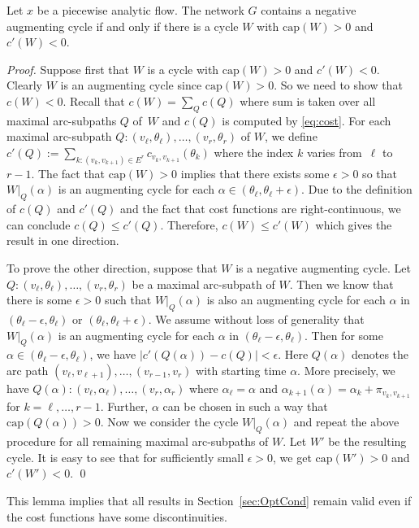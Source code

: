 \documentclass{svjour3}                     \smartqed
\newcommand{\ca}{\ensuremath{\text{cap}}}
\begin{document}
\begin{lemma}
\label{lem:neg-aug-cycle}
Let $x$ be a piecewise analytic flow. The network $G$ contains a negative augmenting cycle if and only if there is a cycle $W$ with $\ca(W)>0$ and \mbox{$c'(W)<0$}.
\end{lemma}
\begin{proof}
Suppose first that $W$ is a cycle with $\ca(W)>0$ and $c'(W)<0$. Clearly $W$ is an augmenting cycle since $\ca(W)>0$. So we need to show that $c(W)<0$. Recall that $c(W)=\sum_{Q} c(Q)$ where sum is taken over all maximal arc-subpaths $Q$ of~$W$ and $c(Q)$ is computed by \eqref{eq:cost}. For each maximal arc-subpath $Q:(v_\ell,\theta_\ell),\ldots,(v_r,\theta_r)$ of $W$, we define $c'(Q):=\sum_{k:(v_k,v_{k+1})\in E^r} c_{v_k,v_{k+1}}(\theta_{k})$ where the index $k$ varies from~$\ell$ to $r-1$. The fact that $\ca(W)>0$ implies that there exists some $\epsilon>0$ so that $W|_Q(\alpha)$ is an augmenting cycle for each $\alpha\in (\theta_\ell,\theta_\ell+\epsilon)$. Due to the definition of $c(Q)$ and $c'(Q)$ and the fact that cost functions are right-continuous, we can conclude $c(Q)\leq c'(Q)$. Therefore, $c(W)\leq c'(W)$ which gives the result in one direction.

To prove the other direction, suppose that $W$ is a negative augmenting cycle. Let $Q:(v_\ell,\theta_\ell),\ldots,(v_r,\theta_r)$ be a maximal arc-subpath of $W$. Then we know that there is some $\epsilon>0$ such that $W|_Q(\alpha)$ is also an augmenting cycle for each $\alpha$ in $(\theta_\ell-\epsilon,\theta_\ell)$ or $(\theta_\ell,\theta_\ell+\epsilon)$. We assume without loss of generality that $W|_Q(\alpha)$ is an augmenting cycle for each $\alpha$ in $(\theta_\ell-\epsilon,\theta_\ell)$. Then for some $\alpha\in (\theta_\ell-\epsilon,\theta_\ell)$, we have $|c'(Q(\alpha))-c(Q)|<\epsilon$. Here $Q(\alpha)$ denotes the arc path $(v_\ell,v_{\ell+1}),\ldots, (v_{r-1},v_r)$ with starting time $\alpha$. More precisely, we have $Q(\alpha):(v_\ell,\alpha_\ell),\ldots,(v_r,\alpha_r)$ where $\alpha_\ell=\alpha$ and $\alpha_{k+1}(\alpha)=\alpha_{k}+\pi_{v_{k},v_{k+1}}$ for $k=\ell,\ldots,r-1$.
Further, $\alpha$ can be chosen in such a way that $\ca(Q(\alpha))>0$. Now we consider the cycle $W|_Q(\alpha)$ and repeat the above procedure for all remaining maximal arc-subpaths of $W$. Let $W'$ be the resulting cycle. It is easy to see that for sufficiently small $\epsilon>0$, we get $\ca(W')>0$ and $c'(W')<0$.
\qed
\end{proof}

This lemma  implies that all results in Section~\ref{sec:OptCond} remain valid even if the cost functions have some discontinuities.
\end{document}
